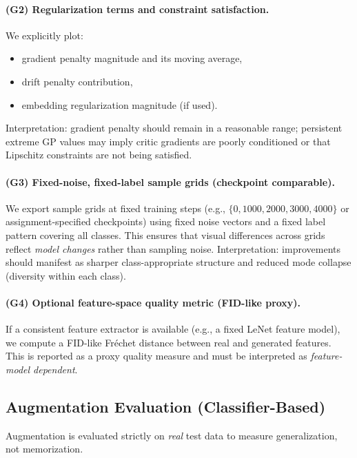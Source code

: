 \paragraph{(G2) Regularization terms and constraint satisfaction.}
We explicitly plot:
\begin{itemize}
  \item gradient penalty magnitude and its moving average,
  \item drift penalty contribution,
  \item embedding regularization magnitude (if used).
\end{itemize}
Interpretation: gradient penalty should remain in a reasonable range; persistent extreme GP values may imply critic gradients are poorly conditioned or that Lipschitz constraints are not being satisfied.

\paragraph{(G3) Fixed-noise, fixed-label sample grids (checkpoint comparable).}
We export sample grids at fixed training steps (e.g., $\{0,1000,2000,3000,4000\}$ or assignment-specified checkpoints) using fixed noise vectors and a fixed label pattern covering all classes. This ensures that visual differences across grids reflect \emph{model changes} rather than sampling noise.
Interpretation: improvements should manifest as sharper class-appropriate structure and reduced mode collapse (diversity within each class).

\paragraph{(G4) Optional feature-space quality metric (FID-like proxy).}
If a consistent feature extractor is available (e.g., a fixed LeNet feature model), we compute a FID-like Fréchet distance between real and generated features. This is reported as a proxy quality measure and must be interpreted as \emph{feature-model dependent}.

\subsection{Augmentation Evaluation (Classifier-Based)}
Augmentation is evaluated strictly on \emph{real} test data to measure generalization, not memorization.

